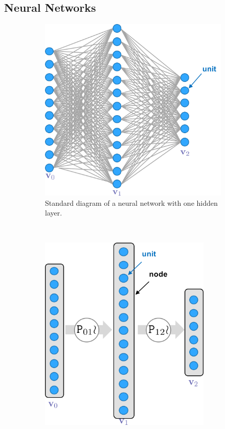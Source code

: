 \documentclass[thesis]{subfiles}
\begin{document}
\subsection{Neural Networks}
\begin{figure}[htbp!] 
\centering
\begin{subfigure}[b]{0.45\textwidth}
   \centering
   \includegraphics[width=\textwidth]{fullyconnected}
   \caption{Standard diagram of a neural network with one hidden layer.}
   \label{fig:oldnotation}
\end{subfigure}
~
\begin{subfigure}[b]{0.45\textwidth}
   \centering
   \includegraphics[width=0.9\textwidth]{newnotation}

\end{subfigure}
\end{figure}
\end{document}
